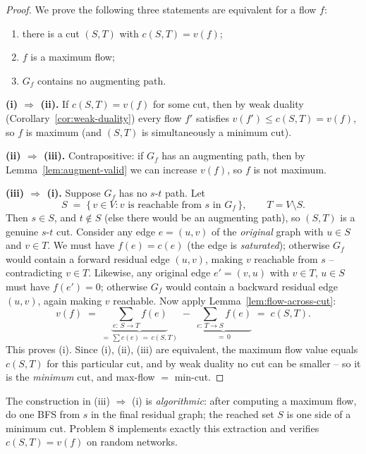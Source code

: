 \documentclass[11pt]{article}
\begin{document}
\begin{proof}
We prove the following three statements are equivalent for a flow $f$:
\begin{enumerate}[label=(\roman*)]
    \item there is a cut $(S,T)$ with $c(S,T) = v(f)$;
    \item $f$ is a maximum flow;
    \item $G_f$ contains no augmenting path.
\end{enumerate}

\textbf{(i) $\Rightarrow$ (ii).} If $c(S,T) = v(f)$ for some cut, then by weak duality
(Corollary~\ref{cor:weak-duality}) every flow $f'$ satisfies $v(f') \le c(S,T) = v(f)$,
so $f$ is maximum (and $(S,T)$ is simultaneously a minimum cut).

\textbf{(ii) $\Rightarrow$ (iii).} Contrapositive: if $G_f$ has an augmenting path, then
by Lemma~\ref{lem:augment-valid} we can increase $v(f)$, so $f$ is not maximum.

\textbf{(iii) $\Rightarrow$ (i).} Suppose $G_f$ has no $s$-$t$ path. Let
\[
    S \;=\; \{\, v \in V : v \text{ is reachable from } s \text{ in } G_f \,\},
    \qquad T = V \setminus S.
\]
Then $s \in S$, and $t \notin S$ (else there would be an augmenting path), so $(S,T)$ is a
genuine $s$-$t$ cut. Consider any edge $e=(u,v)$ of the \emph{original} graph with
$u \in S$ and $v \in T$. We must have $f(e) = c(e)$ (the edge is \emph{saturated});
otherwise $G_f$ would contain a forward residual edge $(u,v)$, making $v$ reachable from
$s$ -- contradicting $v \in T$. Likewise, any original edge $e'=(v,u)$ with $v \in T$,
$u \in S$ must have $f(e') = 0$; otherwise $G_f$ would contain a backward residual edge
$(u,v)$, again making $v$ reachable. Now apply Lemma~\ref{lem:flow-across-cut}:
\[
    v(f) \;=\; \underbrace{\sum_{e:\, S \to T} f(e)}_{=\,\sum c(e)\,=\,c(S,T)}
            \;-\; \underbrace{\sum_{e:\, T \to S} f(e)}_{=\,0}
        \;=\; c(S,T).
\]
This proves (i). Since (i), (ii), (iii) are equivalent, the maximum flow value equals
$c(S,T)$ for this particular cut, and by weak duality no cut can be smaller -- so it is the
\emph{minimum} cut, and max-flow $=$ min-cut.
\end{proof}

The construction in (iii) $\Rightarrow$ (i) is \emph{algorithmic}: after computing a
maximum flow, do one BFS from $s$ in the final residual graph; the reached set $S$ is one
side of a minimum cut. Problem 8 implements exactly this extraction and verifies
$c(S,T) = v(f)$ on random networks.
\end{document}
